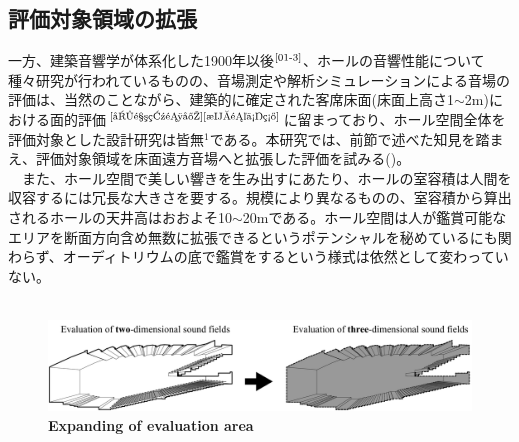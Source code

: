 \clearpage
\subsection{評価対象領域の拡張}
一方、建築音響学が体系化した1900年以後$^{\text{\cite{01-3}}}$、ホールの音響性能について種々研究が行われているものの、音場測定や解析シミュレーションによる音場の評価は、当然のことながら、建築的に確定された客席床面(床面上高さ1$\sim$2m)における面的評価$^{\text{\cite{受音点選定}{\cite{最適位置}}}}$に留まっており、ホール空間全体を評価対象とした設計研究は皆無$^1$である。本研究では、前節で述べた知見を踏まえ、評価対象領域を床面遠方音場へと拡張した評価を試みる()。
\\　また、ホール空間で美しい響きを生み出すにあたり、ホールの室容積は人間を収容するには冗長な大きさを要する。規模により異なるものの、室容積から算出されるホールの天井高はおおよそ10$\sim$20mである。ホール空間は人が鑑賞可能なエリアを断面方向含め無数に拡張できるというポテンシャルを秘めているにも関わらず、オーディトリウムの底で鑑賞をするという様式は依然として変わっていない。
\\　
\begin{figure}[htbp]
    \centering
    \includegraphics[keepaspectratio,scale=0.41]{01_att/evaluate_area.pdf}
    \caption{\hspace{1mm}\textbf{Expanding of evaluation area}}
    \label{fig:評価対象領域の拡張}
\end{figure}

\addtocounter{footnote}{1}

\pagebreak
